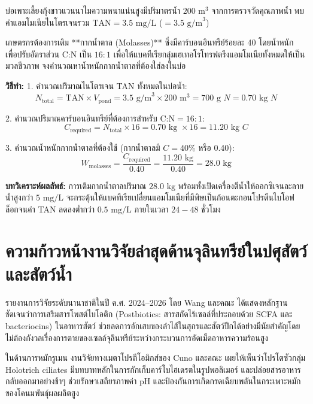 \begin{worked}
บ่อเพาะเลี้ยงกุ้งขาวแวนนาไมความหนาแน่นสูงมีปริมาตรน้ำ $200\text{ m}^3$ จากการตรวจวัดคุณภาพน้ำ พบค่าแอมโมเนียไนโตรเจนรวม $\text{TAN} = 3.5\text{ mg/L}$ ($= 3.5\text{ g/m}^3$) 

เกษตรกรต้องการเติม **กากน้ำตาล (Molasses)** ซึ่งมีคาร์บอนอินทรีย์ร้อยละ 40 โดยน้ำหนัก เพื่อปรับอัตราส่วน C:N เป็น $16:1$ เพื่อให้แบคทีเรียกลุ่มเฮเทอโรโทรฟตรึงแอมโมเนียทั้งหมดให้เป็นมวลชีวภาพ จงคำนวณหาน้ำหนักกากน้ำตาลที่ต้องใส่ลงในบ่อ

\textbf{วิธีทำ:}
1. คำนวณปริมาณไนโตรเจน TAN ทั้งหมดในบ่อน้ำ:
$$N_{\text{total}} = \text{TAN} \times V_{\text{pond}} = 3.5\text{ g/m}^3 \times 200\text{ m}^3 = 700\text{ g } N = 0.70\text{ kg } N$$

2. คำนวณปริมาณคาร์บอนอินทรีย์ที่ต้องการสำหรับ $\text{C:N} = 16:1$:
$$C_{\text{required}} = N_{\text{total}} \times 16 = 0.70\text{ kg } \times 16 = 11.20\text{ kg } C$$

3. คำนวณน้ำหนักกากน้ำตาลที่ต้องใช้ (กากน้ำตาลมี $C = 40\%$ หรือ 0.40):
$$W_{\text{molasses}} = \frac{C_{\text{required}}}{0.40} = \frac{11.20\text{ kg}}{0.40} = 28.0\text{ kg}$$

\textbf{บทวิเคราะห์ผลลัพธ์:} การเติมกากน้ำตาลปริมาณ $28.0\text{ kg}$ พร้อมทั้งเปิดเครื่องตีน้ำให้ออกซิเจนละลายน้ำสูงกว่า $5\text{ mg/L}$ จะกระตุ้นให้แบคทีเรียเปลี่ยนแอมโมเนียที่มีพิษเป็นก้อนตะกอนโปรตีนไบโอฟล็อกจนค่า TAN ลดลงต่ำกว่า $0.5\text{ mg/L}$ ภายในเวลา $24 - 48\text{ ชั่วโมง}$
\end{worked}

\section{ความก้าวหน้างานวิจัยล่าสุดด้านจุลินทรีย์ในปศุสัตว์และสัตว์น้ำ}

รายงานการวิจัยระดับนานาชาติในปี ค.ศ. 2024–2026 โดย Wang และคณะ \cite{pmid41153915} ได้แสดงหลักฐานชัดเจนว่าการเสริมสารโพสต์ไบโอติก (Postbiotics: สารสกัดไร้เซลล์ที่ประกอบด้วย SCFA และ bacteriocins) ในอาหารสัตว์ ช่วยลดการอักเสบของลำไส้ในสุกรและสัตว์ปีกได้อย่างมีนัยสำคัญโดยไม่ต้องกังวลเรื่องการตายของเซลล์จุลินทรีย์ระหว่างกระบวนการอัดเม็ดอาหารความร้อนสูง

ในด้านการหมักรูเมน งานวิจัยทางเมตาโปรตีโอมิกส์ของ Cuno และคณะ \cite{pmid37169869} เผยให้เห็นว่าโปรโตซัวกลุ่ม Holotrich ciliates มีบทบาทหลักในการกักเก็บคาร์โบไฮเดรตในรูปพอลิเมอร์ และปล่อยสารอาหารกลับออกมาอย่างช้าๆ ช่วยรักษาเสถียรภาพค่า pH และป้องกันการเกิดกรดเฉียบพลันในกระเพาะหมักของโคนมพันธุ์ผลผลิตสูง

